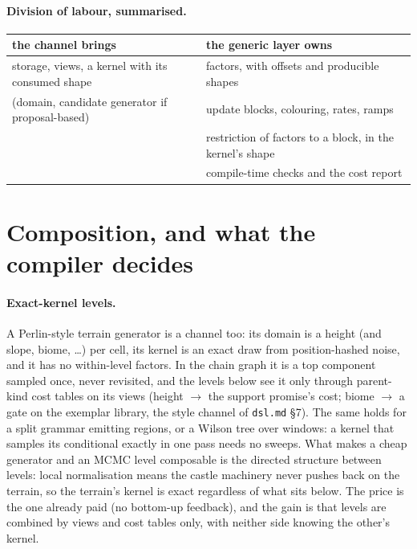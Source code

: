 \documentclass[11pt]{article}
\newcommand{\1}{\mathds{1}}
\begin{document}
\paragraph{Division of labour, summarised.}
\begin{center}
\small
\begin{tabular}{@{}ll@{}}
\toprule
the channel brings & the generic layer owns \\
\midrule
storage, views, a kernel with its consumed shape & factors, with offsets and producible shapes \\
(domain, candidate generator if proposal-based) & update blocks, colouring, rates, ramps \\
 & restriction of factors to a block, in the kernel's shape \\
 & compile-time checks and the cost report \\
\bottomrule
\end{tabular}
\end{center}

\section{Composition, and what the compiler decides}
\label{sec:compiler}

\paragraph{Exact-kernel levels.} A Perlin-style terrain generator is a channel
too: its domain is a height (and slope, biome, \ldots) per cell, its kernel is
an exact draw from position-hashed noise, and it has no within-level factors.
In the chain graph it is a top component sampled once, never revisited, and
the levels below see it only through parent-kind cost tables on its views
(height $\to$ the support promise's cost; biome $\to$ a gate on the exemplar
library, the style channel of \texttt{dsl.md} \S7). The same holds for a split
grammar emitting regions, or a Wilson tree over windows: a kernel that samples
its conditional exactly in one pass needs no sweeps. What makes a cheap
generator and an MCMC level composable is the directed structure between
levels: local normalisation means the castle machinery never pushes back on the
terrain, so the terrain's kernel is exact regardless of what sits below. The
price is the one already paid (no bottom-up feedback), and the gain is that
levels are combined by views and cost tables only, with neither side knowing
the other's kernel.
\end{document}
